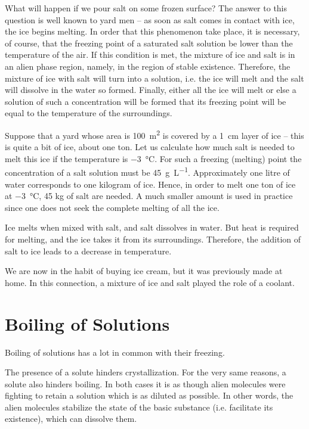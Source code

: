 What will happen if we pour salt on some frozen surface? The answer to this question is well known to yard men -- as soon as salt comes in contact with ice, the ice begins melting. In order that this phenomenon take place, it is necessary, of course, that the freezing point of a saturated salt solution be lower than the temperature of the air. If this condition is met, the mixture of ice and salt is in an alien phase region, namely, in the region of stable exi­stence. Therefore, the mixture of ice with salt will turn into a solution, i.e. the ice will melt and the salt will dissolve in the water so formed. Finally, either all the ice will melt or else a solution of such a concentration will be formed that its freezing point will be equal to the tem­perature of the surroundings.

Suppose that a yard whose area is \SI{100}{\meter\squared} is covered by a \SI{1}{\centi\meter} layer of ice -- this is quite a bit of ice, about one ton. Let us calculate how much salt is needed to melt this ice if the temperature is \SI{-3}{\celsius}. For such a freezing (melting) point the concentration of a salt solution must be \SI{45}{\gram\per\liter}. Approximately one litre of water corresponds to one kilogram of ice. Hence, in order to melt one ton of ice at \SI{-3}{\celsius}, 45 kg of salt are needed. A much smaller amount is used in practice since one does not seek the complete melting of all the ice.

Ice melts when mixed with salt, and salt dissolves in water. But heat is required for melting, and the ice takes it from its surroundings. Therefore, the addition of salt to ice leads to a decrease in temperature.

We are now in the habit of buying ice cream, but it was previously made at home. In this connection, a mixture of ice and salt played the role of a coolant.

\section{Boiling of Solutions}

Boiling of solutions has a lot in common with their freezing.

The presence of a solute hinders crystallization. For the very same reasons, a solute also hinders boiling. In both cases it is as though alien molecules were fighting to retain a solution which is as diluted as possible. In other words, the alien molecules stabilize the state of the basic substance (i.e. facilitate its existence), which can dissolve them.

